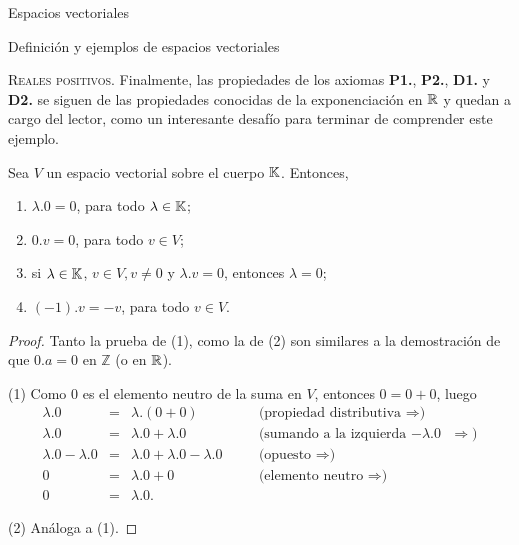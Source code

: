 \begin{chapter}{Espacios vectoriales}
\begin{section}{Definici\'on y ejemplos de espacios vectoriales}
\begin{ejemplo*}{\textsc{Reales positivos.}}
Finalmente, las propiedades de los axiomas \textbf{P1.}, \textbf{P2.}, \textbf{D1.} y \textbf{D2.} se siguen de las propiedades conocidas de la exponenciación en $\mathbb R$ y quedan a cargo del lector, como un interesante desafío para terminar de comprender este ejemplo.
\end{ejemplo*}            

            \begin{proposicion}\label{prop-basicas-ev} Sea $V$ un espacio vectorial sobre el cuerpo $\mathbb K$. Entonces,
                \begin{enumerate}
                    \item\label{c*0=0} $\lambda.0=0$, para todo $\lambda \in \mathbb K$;
                    \item\label{0*c=0} $0.v = 0$, para todo $v \in V$;
                    \item\label{c*v=0} si $\lambda \in \mathbb K$, $v \in V, v\ne 0$ y $\lambda.v=0$,  entonces $\lambda =0$;
                    \item\label{-1*v=-v} $(-1).v = -v$, para todo $v \in V$.
                \end{enumerate}
            \end{proposicion}
            \begin{proof} Tanto la prueba de (1), como la de (2) son similares a la demostración de que $0.a=0$  en $\mathbb Z$ (o en  $\mathbb R$).
                 
                (1) Como $0$ es el elemento neutro de la suma en $V$, entonces $0 = 0 +0$, luego 
                \begin{equation*}
                    \begin{array}{rllll}
                    \lambda.0 &=& \lambda.(0+0)&\quad&\text{(propiedad distributiva $\Rightarrow$)}  \\
                    \lambda.0&=& \lambda.0 + \lambda.0 && \text{(sumando a la izquierda $-\lambda.0$ $\Rightarrow$)} \\
                \lambda.0 - \lambda.0 &=& \lambda.0 + \lambda.0 -\lambda.0 && \text{(opuesto $\Rightarrow$)}\\
                    0 &=& \lambda.0 +0  &&\text{(elemento neutro $\Rightarrow$)}\\
                    0 &=& \lambda.0.
                    \end{array}
                \end{equation*}
                
                (2) Análoga a (1).
                

\end{proof}
\end{section}
\end{chapter}
